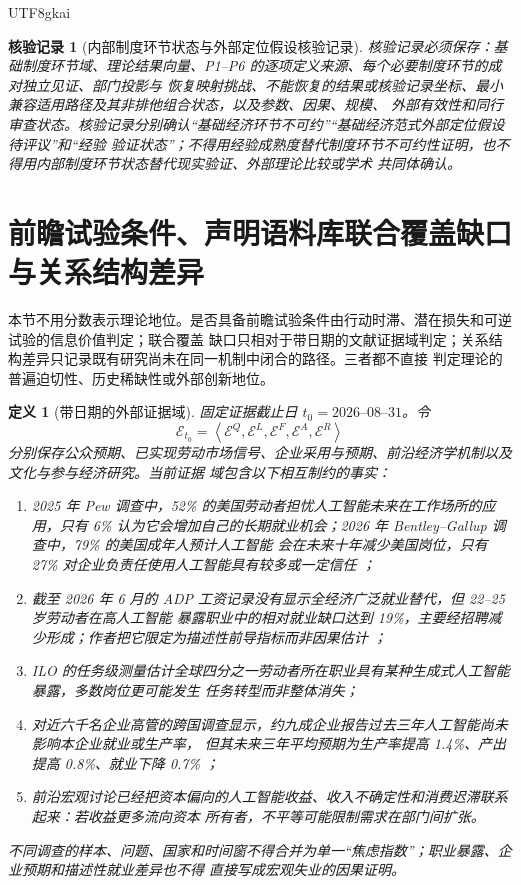 \documentclass[12pt,a4paper,openany]{report}
\newtheorem{definition}{定义}[chapter]
\newtheorem{Certificate}{核验记录}[chapter]
\newcommand{\Tuple}[1]{\left\langle #1\right\rangle}
\begin{document}
\begin{CJK*}{UTF8}{gkai}
\begin{Certificate}[内部制度环节状态与外部定位假设核验记录]
核验记录必须保存：基础制度环节域、理论结果向量、P1--P6 的逐项定义来源、每个必要制度环节的成对独立见证、部门投影与
恢复映射挑战、不能恢复的结果或核验记录坐标、最小兼容适用路径及其非排他组合状态，以及参数、因果、规模、
外部有效性和同行审查状态。核验记录分别确认“基础经济环节不可约”“基础经济范式外部定位假设待评议”和“经验
验证状态”；不得用经验成熟度替代制度环节不可约性证明，也不得用内部制度环节状态替代现实验证、外部理论比较或学术
共同体确认。
\end{Certificate}

\section{前瞻试验条件、声明语料库联合覆盖缺口与关系结构差异}
\label{sec:urgency-scarcity-innovation}

本节不用分数表示理论地位。是否具备前瞻试验条件由行动时滞、潜在损失和可逆试验的信息价值判定；联合覆盖
缺口只相对于带日期的文献证据域判定；关系结构差异只记录既有研究尚未在同一机制中闭合的路径。三者都不直接
判定理论的普遍迫切性、历史稀缺性或外部创新地位。

\begin{definition}[带日期的外部证据域]
固定证据截止日 \(t_0=\text{2026--08--31}\)。令
\[
  \mathcal E_{t_0}
  =\Tuple{
  \mathcal E^{Q},
  \mathcal E^{L},
  \mathcal E^{F},
  \mathcal E^{A},
  \mathcal E^{R}
  }
\]
分别保存公众预期、已实现劳动市场信号、企业采用与预期、前沿经济学机制以及文化与参与经济研究。当前证据
域包含以下相互制约的事实：
\begin{enumerate}[label=\textup{(E\arabic*)},leftmargin=4em]
  \item 2025 年 Pew 调查中，52\% 的美国劳动者担忧人工智能未来在工作场所的应用，只有 6\%
  认为它会增加自己的长期就业机会；2026 年 Bentley--Gallup 调查中，79\% 的美国成年人预计人工智能
  会在未来十年减少美国岗位，只有 27\% 对企业负责任使用人工智能具有较多或一定信任
  \cite{Pew2025WorkersAI,Gallup2026AI}；
  \item 截至 2026 年 6 月的 ADP 工资记录没有显示全经济广泛就业替代，但 22--25 岁劳动者在高人工智能
  暴露职业中的相对就业缺口达到 19\%，主要经招聘减少形成；作者把它限定为描述性前导指标而非因果估计
  \cite{BrynjolfssonChandarChen2026}；
  \item ILO 的任务级测量估计全球四分之一劳动者所在职业具有某种生成式人工智能暴露，多数岗位更可能发生
  任务转型而非整体消失\cite{ILO2025GenAIJobs}；
  \item 对近六千名企业高管的跨国调查显示，约九成企业报告过去三年人工智能尚未影响本企业就业或生产率，
  但其未来三年平均预期为生产率提高 1.4\%、产出提高 0.8\%、就业下降 0.7\%
  \cite{YotzovEtAl2026}；
  \item 前沿宏观讨论已经把资本偏向的人工智能收益、收入不确定性和消费迟滞联系起来：若收益更多流向资本
  所有者，不平等可能限制需求在部门间扩张\cite{ECB2026AIMonetaryPolicy}。
\end{enumerate}
不同调查的样本、问题、国家和时间窗不得合并为单一“焦虑指数”；职业暴露、企业预期和描述性就业差异也不得
直接写成宏观失业的因果证明。
\end{definition}


\end{CJK*}
\end{document}
